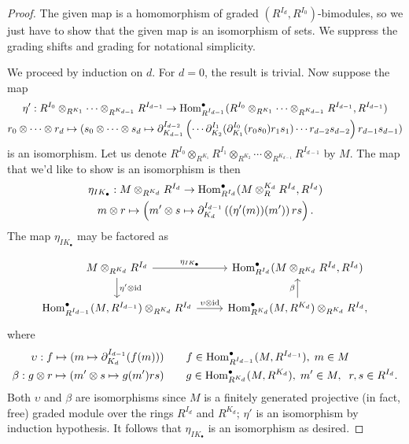\begin{proof}
    The given map is a homomorphism of graded $(R^{I_d}, R^{I_0})$-bimodules, so we just have to show that the given map is an isomorphism of sets. We suppress the grading shifts and grading for notational simplicity.
    
    We proceed by induction on $d$. For $d=0$, the result is trivial.
    Now suppose the map 
    \begin{gather}
      \notag \eta': R^{I_0}\otimes_{R^{K_1}} \cdots \otimes_{R^{K_{d-1}}}R^{I_{d-1}} \rightarrow  \operatorname{Hom}^\bullet_{R^{I_{d-1}}}(R^{I_0}\otimes_{R^{K_1}} \cdots \otimes_{R^{K_{d-1}}}R^{I_{d-1}}, R^{I_{d-1}})\\
      \notag  r_0 \otimes \cdots \otimes r_d 
      \mapsto (s_0\otimes \cdots \otimes s_d \mapsto \partial^{I_{d-2}}_{K_{d-1}}\left(\cdots \partial^{I_1}_{K_2}(\partial^{I_0}_{K_1}(r_0s_0)r_1s_1) \cdots r_{d-2}s_{d-2} \right)r_{d-1}s_{d-1})
    \end{gather}
    is an isomorphism.
    Let us denote $ R^{I_0}\otimes_{R^{K_1}} R^{I_1}\otimes_{R^{K_2}} \cdots \otimes_{R^{K_{d-1}}}R^{I_{d-1}}$ by $M$.
     The map that we'd like to show is an isomorphism is then
    \begin{gather*}
       \eta_{IK_\bullet}:M\otimes_{R^{K_d}}R^{I_d} \rightarrow \operatorname{Hom}^\bullet_{R^{I_d}}(M \otimes_R^{K_d}R^{I_d}, R^{I_d}) \\
       m \otimes r \mapsto \left(m' \otimes s \mapsto \partial^{I_{d-1}}_{K_d}\left((\eta'(m))(m')\right)r s\right).
    \end{gather*}
The map $\eta_{IK_\bullet}$ may be factored as

\[
\begin{tikzcd}
   M \otimes_{R^{K_d}} R^{I_d} \arrow[r, "\eta_{IK_\bullet}"] \arrow[d, "\eta'\otimes \id"] &\Hom^\bullet_{R^{I_d}}(M \otimes_{R^{K_d}} R^{I_d}, R^{I_d}) \\
   \Hom^\bullet_{R^{I_{d-1}}}(M, R^{I_{d-1}})\otimes_{R^{K_d}} R^{I_d} \arrow[r, "\upsilon \otimes \id"] & \Hom^\bullet_{R^{K_d}}(M ,R^{K_d})\otimes_{R^{K_d}} R^{I_d} \arrow[u, "\beta"],
\end{tikzcd}\]
    where
    \begin{align*}
        \upsilon: f\mapsto  (m \mapsto \partial^{I_{d-1}}_{K_d}(f(m))) \qquad &f \in \operatorname{Hom}^\bullet_{R^{I_{d-1}}}(M,R^{I_{d-1}}),\; m \in M\\
        \beta: g \otimes r \mapsto (m'\otimes s\mapsto g(m')rs) \qquad&g \in \operatorname{Hom}^\bullet_{R^{K_d}}(M,R^{K_d}), \; m' \in M,\;\; r,s \in R^{I_d}.
    \end{align*}
    Both $\upsilon$ and $\beta$ are isomorphisms since $M$ is a finitely generated projective (in fact, free) graded module over the rings $R^{I_d}$ and $R^{K_d}$; $\eta'$ is an isomorphism by induction hypothesis.
    It follows that $\eta_{IK_\bullet}$ is an isomorphism as desired.
\end{proof}



